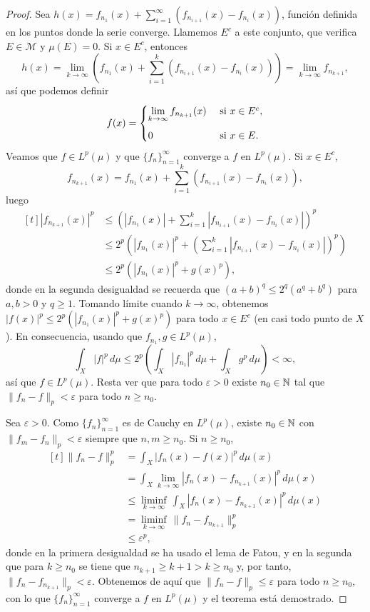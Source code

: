 \documentclass[a4paper, 11pt, oneside]{report}
\begin{document}
\begin{proof}
  Sea $h(x)=f_{n_1}(x)+\sum_{i=1}^\infty (f_{n_{i+1}}(x)-f_{n_i}(x))$, función definida en los puntos donde la serie converge. Llamemos $E^c$ a este conjunto, que verifica $E \in \mathcal{M}$ y $\mu(E)=0$. Si $x \in E^c$, entonces 
  \[h(x)=\lim_{k \to \infty} \left(f_{n_1}(x)+\sum_{i=1}^k (f_{n_{i+1}}(x)-f_{n_i}(x))\right) = \lim_{k \to \infty} f_{n_{k+1}},\] 
  así que podemos definir
  \[f(x)=\begin{cases}
    \displaystyle \lim_{k \to \infty} f_{n_{k+1}}(x) & $ si $ x \in E^c, \\[10pt]
    0 & $ si $ x \in E.
  \end{cases}\]
  Veamos que $f \in L^p(\mu)$ y que $\{f_n\}_{n=1}^\infty$ converge a $f$ en $L^p(\mu)$. Si $x \in E^c$,
  \[f_{n_{k+1}}(x)=f_{n_1}(x)+\sum_{i=1}^k (f_{n_{i+1}}(x)-f_{n_i}(x)),\]
  luego
  \[
  \begin{aligned}[t]
    |f_{n_{k+1}}(x)|^p &\leq \left(|f_{n_1}(x)|+\sum_{i=1}^k|f_{n_{i+1}}(x)-f_{n_i}(x)|\right)^p \\ &\leq 2^p\left(|f_{n_1}(x)|^p + \left(\sum_{i=1}^k |f_{n_{i+1}}(x)-f_{n_i}(x)|\right)^p\right) \\
    &\leq 2^p\left(|f_{n_1}(x)|^p+g(x)^p\right),
  \end{aligned}
  \]
  donde en la segunda desigualdad se recuerda que $(a+b)^q \leq 2^q(a^q+b^q)$ para $a,b>0$ y $q\geq 1$. Tomando límite cuando $k \to \infty$, obtenemos $|f(x)|^p \leq 2^p\left(|f_{n_1}(x)|^p +g(x)^p\right)$ para todo $x \in E^c$ (en casi todo punto de $X$). En consecuencia, usando que $f_{n_1},g \in L^p(\mu)$,
  \[\int_X |f|^p \, d\mu \leq 2^p\left(\int_X|f_{n_1}|^p \, d\mu + \int_X g^p \, d\mu\right) < \infty,\]
  así que $f \in L^p(\mu)$. Resta ver que para todo $\varepsilon >0$ existe $n_0\in \mathbb N$ tal que $\|f_n-f\|_p < \varepsilon$ para todo $n \geq n_0$.

  Sea $\varepsilon>0$. Como $\{f_n\}_{n=1}^\infty$ es de Cauchy en $L^p(\mu)$, existe $n_0 \in \mathbb N$ con $\|f_m-f_n\|_p < \varepsilon$ siempre que $n,m\geq n_0$. Si $n \geq n_0$,
  \[
  \begin{aligned}[t]
  \|f_n-f\|_p^p &= \int_X |f_n(x)-f(x)|^p \, d\mu(x) \\
  &= \int_X \lim_{k \to \infty} |f_n(x)-f_{n_{k+1}}(x)|^p \, d\mu(x) \\
  &\leq \liminf_{k \to \infty} \, \int_X |f_n(x)-f_{n_{k+1}}(x)|^p \, d\mu(x) \\
  &= \liminf_{k \to \infty} \, \|f_n-f_{n_{k+1}}\|_p^p \\
  &\leq \varepsilon^p,
  \end{aligned}\]
  donde en la primera desigualdad se ha usado el lema de Fatou, y en la segunda que para $k \geq n_0$ se tiene que $n_{k+1} \geq k+1 > k \geq n_0$ y, por tanto, $\|f_n-f_{n_{k+1}}\|_p < \varepsilon$. Obtenemos de aquí que $\|f_n-f\|_p \leq \varepsilon$ para todo $n \geq n_0$, con lo que $\{f_n\}_{n=1}^\infty$ converge a $f$ en $L^p(\mu)$ y el teorema está demostrado.
\end{proof}
\end{document}

